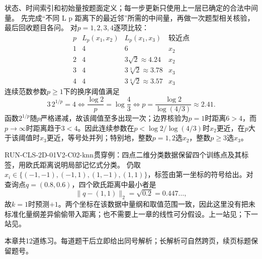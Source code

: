 \label{struct:V2-C02-CH33}
\begin{solution}
\SolGiven 状态、时间索引和初始量按题面定义；每一步更新只使用上一层已确定的合法中间量。
\SolPlan 先完成“不同 L p 距离下的最近邻”所需的中间量，再做一次题型相关核验，最后回收题目各问。
\SolDerive
对$p=1,2,3,4$逐项比较：
\[
\begin{array}{c|c|c|c}
p&L_p(x_1,x_2)&L_p(x_1,x_3)&\text{较近点}\\ \hline
1&4&6&x_2\\
2&4&3\sqrt2\approx4.24&x_2\\
3&4&3\sqrt[3]{2}\approx3.78&x_3\\
4&4&3\sqrt[4]{2}\approx3.57&x_3
\end{array}
\]
连续范数参数$p\geq 1$下的换序阈值满足
\[
3\,2^{1/p}=4
\Longleftrightarrow
\frac{\log2}{p}=\log\frac43
\Longleftrightarrow
p=\frac{\log2}{\log(4/3)}\approx2.41.
\]
函数$2^{1/p}$随$p$严格递减，故该阈值至多出现一次；边界核验为$p=1$时距离$6>4$，而$p\to\infty$时距离趋于$3<4$。因此连续参数在$p<\log2/\log(4/3)$时$x_2$更近，在$p$大于该阈值时$x_3$更近，等号处并列；特别地，整数$p=1,2$选$x_2$，整数$p\ge3$选$x_3$。

\begin{SLRunningExample}{RUN-CLS-2D-01}{V2-C02-knn}{贯穿例：四点二维分类数据}{保留四个训练点及其标签，用欧氏距离说明局部记忆式分类。}
仍取$x_i\in\{(-1,-1),(-1,1),(1,-1),(1,1)\}$，标签由第一坐标的符号给出。对查询点$q=(0.8,0.6)$，四个欧氏距离中最小者是
\[
\lVert q-(1,1)\rVert_2=\sqrt{0.2}=0.447\ldots,
\]
故$k=1$时预测$+1$。两个坐标在该数据中量纲和取值范围一致，因此这里没有把未标准化量纲差异偷偷带入距离；\kNN{}也不需要上一章的线性可分假设。上一站见；下一站见。
\end{SLRunningExample}
\end{solution}


\label{struct:V2-C02-CH34}
\begin{chapterexercisebox}
\label{struct:V2-C02-CH35}
本章共12道练习。每道题干后立即给出同号解析；长解析可自然跨页，续页标题保留题号。
\end{chapterexercisebox}

